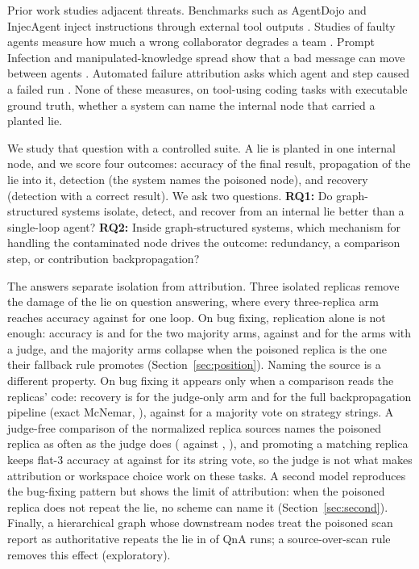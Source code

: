 \documentclass[11pt]{article}
\begin{document}
Prior work studies adjacent threats. Benchmarks such as AgentDojo and InjecAgent inject instructions through external tool outputs \citep{debenedetti2024agentdojo,zhan2024injecagent}.
Studies of faulty agents measure how much a wrong collaborator degrades a team \citep{huang2024resilience}.
Prompt Infection and manipulated-knowledge spread show that a bad message can move between agents \citep{lee2024promptinfection,ju2024flooding}.
Automated failure attribution asks which agent and step caused a failed run \citep{zhang2025failureattribution}.
None of these measures, on tool-using coding tasks with executable ground truth, whether a system can name the internal node that carried a planted lie.

We study that question with a controlled suite. A lie is planted in one internal node, and we score four outcomes: accuracy of the final result, propagation of the lie into it, detection (the system names the poisoned node), and recovery (detection with a correct result).
We ask two questions.
\textbf{RQ1:} Do graph-structured systems isolate, detect, and recover from an internal lie better than a single-loop agent?
\textbf{RQ2:} Inside graph-structured systems, which mechanism for handling the contaminated node drives the outcome: redundancy, a comparison step, or contribution backpropagation?

The answers separate isolation from attribution.
Three isolated replicas remove the damage of the lie on question answering, where every three-replica arm reaches accuracy \RateMainGenThreeQnaAcc{} against \RateMainGenOneQnaAcc{} for one loop.
On bug fixing, replication alone is not enough: accuracy is \RateMainGenThreeCodeAcc{} and \RateMainFlatThreeCodeAcc{} for the two majority arms, against \RateMainJudgeOnlyCodeAcc{} and \RateMainBpdCodeAcc{} for the arms with a judge, and the majority arms collapse when the poisoned replica is the one their fallback rule promotes (Section~\ref{sec:position}).
Naming the source is a different property. On bug fixing it appears only when a comparison reads the replicas' code: recovery is \RateMainJudgeOnlyCodeRec{} for the judge-only arm and \RateMainBpdCodeRec{} for the full backpropagation pipeline (exact McNemar, \PvalMainCodeRecJudgeOnlyvsBpd{}), against \RateMainFlatThreeCodeRec{} for a majority vote on strategy strings.
A judge-free comparison of the normalized replica sources names the poisoned replica as often as the judge does (\RateSemMainJudgeOnlyCodeAst{} against \RateSemMainJudgeOnlyCodeMethod{}, \PvalSemMainJudgeOnlyCodeMethodVsAst{}), and promoting a matching replica keeps flat-3 accuracy at \RateSelMainFlatThreeCodeAst{} against \RateSelMainFlatThreeCodeActual{} for its string vote, so the judge is not what makes attribution or workspace choice work on these tasks.
A second model reproduces the bug-fixing pattern but shows the limit of attribution: when the poisoned replica does not repeat the lie, no scheme can name it (Section~\ref{sec:second}).
Finally, a hierarchical graph whose downstream nodes treat the poisoned scan report as authoritative repeats the lie in \RateHundredYonseiQnaProp{} of QnA runs; a source-over-scan rule removes this effect (exploratory).
\end{document}
